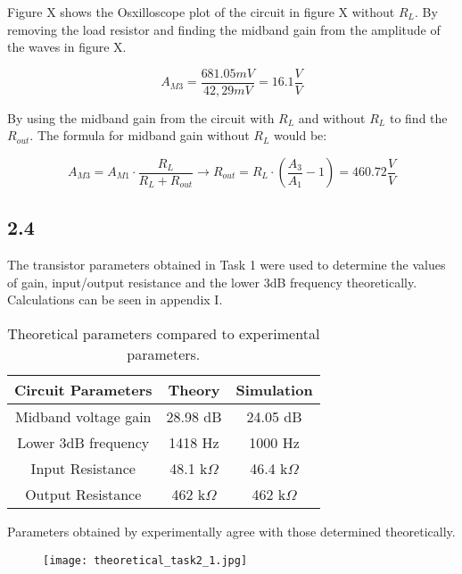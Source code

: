 	Figure X shows the Osxilloscope plot of the circuit in figure X without $R_{L}$. By removing the load resistor and finding the midband gain from the amplitude of the waves in figure X.


	$$ A_{M3} = \frac{681.05 mV}{42,29 mV} = 16.1 \frac{V}{V} $$

	By using the midband gain from the circuit with $R_{L}$ and without $R_{L}$ to find the $R_{out}$. The formula for midband gain without $R_{L}$ would be:


	$$ A_{M3} = A_{M1} \cdot \frac{R_{L}}{R_{L} + R_{out}} \rightarrow R_{out} = R_{L} \cdot (\frac{A_{3}}{A_{1}}-1) = 460.72 \frac{V}{V}$$






\subsection*{2.4}

The transistor parameters obtained in Task 1 were used to determine the values of gain, input/output resistance and the lower 3dB frequency theoretically. Calculations can be seen in appendix I.\\

\begin{table}[htbp]
    \centering
        \begin{tabular}{ c | c | c }
        \hline
        Circuit Parameters     &   Theory                  & Simulation \\
        \hline
        Midband voltage gain    &   28.98 dB			    &   24.05 dB\\
        Lower 3dB frequency     &   1418 Hz                &   1000 Hz\\
        Input Resistance        &   48.1 k$\Omega$           &   46.4 k$\Omega$\\
        Output Resistance       &   462 k$\Omega$            &   462 k$\Omega$\\
        \end{tabular}%
    \caption{Theoretical parameters compared to experimental parameters.}
    \label{tab:addlabel}%
\end{table}%

Parameters obtained by experimentally agree with those determined theoretically.
\pagebreak
\begin{figure}[h!]
\hspace*{1cm}\texttt{[image: theoretical\_task2\_1.jpg]}
\end{figure}
